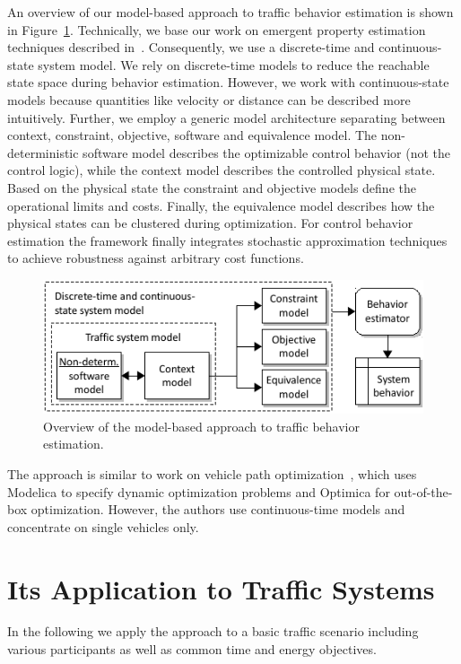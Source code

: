 \documentclass[conference]{../cls/IEEEtran}
\begin{document}
An overview of our model-based approach to traffic behavior estimation is shown in Figure~\ref{fig:framework}. Technically, we base our work on emergent property estimation techniques described in~\cite{Hackenberg2012}. Consequently, we use a discrete-time and continuous-state system model. We rely on discrete-time models to reduce the reachable state space during behavior estimation. However, we work with continuous-state models because quantities like velocity or distance can be described more intuitively. Further, we employ a generic model architecture separating between context, constraint, objective, software and equivalence model. The non-deterministic software model describes the optimizable control behavior (not the control logic), while the context model describes the controlled physical state. Based on the physical state the constraint and objective models define the operational limits and costs. Finally, the equivalence model describes how the physical states can be clustered during optimization. For control behavior estimation the framework finally integrates stochastic approximation techniques~\cite{Pereira1991} to achieve robustness against arbitrary cost functions.

\begin{figure}[h]
	\centering
	\includegraphics{../gfx/framework.pdf}
	\caption{Overview of the model-based approach to traffic behavior estimation.}
	\label{fig:framework}
\end{figure}

The approach is similar to work on vehicle path optimization~\cite{Danielsson2007}, which uses Modelica to specify dynamic optimization problems and Optimica for out-of-the-box optimization. However, the authors use continuous-time models and concentrate on single vehicles only.

\section{Its Application to Traffic Systems}

In the following we apply the approach to a basic traffic scenario including various participants as well as common time and energy objectives.
\end{document}
